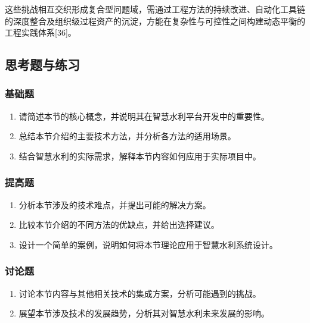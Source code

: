 这些挑战相互交织形成复合型问题域，需通过工程方法的持续改进、自动化工具链的深度整合及组织级过程资产的沉淀，方能在复杂性与可控性之间构建动态平衡的工程实践体系{[}36{]}。

\subsection{思考题与练习}\label{ux601dux8003ux9898ux4e0eux7ec3ux4e60-1}

\subsubsection{基础题}\label{ux57faux7840ux9898-1}

\begin{enumerate}
\def\labelenumi{\arabic{enumi}.}
\tightlist
\item
  请简述本节的核心概念，并说明其在智慧水利平台开发中的重要性。
\item
  总结本节介绍的主要技术方法，并分析各方法的适用场景。
\item
  结合智慧水利的实际需求，解释本节内容如何应用于实际项目中。
\end{enumerate}

\subsubsection{提高题}\label{ux63d0ux9ad8ux9898-1}

\begin{enumerate}
\def\labelenumi{\arabic{enumi}.}
\setcounter{enumi}{3}
\tightlist
\item
  分析本节涉及的技术难点，并提出可能的解决方案。
\item
  比较本节介绍的不同方法的优缺点，并给出选择建议。
\item
  设计一个简单的案例，说明如何将本节理论应用于智慧水利系统设计。
\end{enumerate}

\subsubsection{讨论题}\label{ux8ba8ux8bbaux9898-1}

\begin{enumerate}
\def\labelenumi{\arabic{enumi}.}
\setcounter{enumi}{6}
\tightlist
\item
  讨论本节内容与其他相关技术的集成方案，分析可能遇到的挑战。
\item
  展望本节涉及技术的发展趋势，分析其对智慧水利未来发展的影响。
\end{enumerate}

